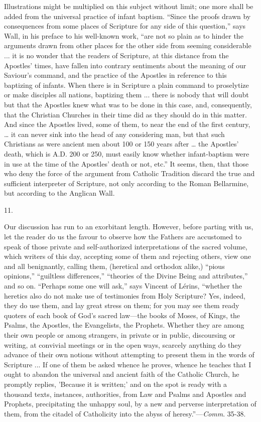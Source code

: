 Illustrations might be multiplied on this subject
without limit; one more shall be added from the universal practice of
infant baptism. ``Since the proofs drawn by consequences from some
places of Scripture for any side of this question,'' says Wall, in his
preface to his well-known work, ``are not so plain as to hinder the
arguments drawn from other places for the other side from seeming
considerable ... it is no wonder that the readers of Scripture, at
this distance from the Apostles' times, have fallen into contrary
sentiments about the meaning of our Saviour's command, and the
practice of the Apostles in reference to this baptizing of infants.
When there is in Scripture a plain command to proselytize or make
disciples all nations, baptizing them ... there is nobody that will
doubt but that the Apostles knew what was to be done in this case,
and, consequently, that the Christian Churches in their time did as
they should do in this matter. And since the Apostles lived, some of
them, to near the end of the first century, … it can never sink into
the head of any considering man, but that such Christians as were
ancient men about 100 or 150 years after … the Apostles' death,
which is A.D. 200 or 250, must
easily know whether infant-baptism were in use at the time of the
Apostles' death or not, etc.'' It seems, then, that those who deny the
force of the argument from Catholic Tradition discard the true and
sufficient interpreter of Scripture, not only according to the Roman
Bellarmine, but according to the Anglican Wall.

11.

Our discussion has run to an exorbitant length.
However, before parting with us, let the reader do us the favour
to observe how the Fathers are accustomed to speak of those private
and self-authorized interpretations of the sacred volume, which
writers of this day, accepting some of them and rejecting others, view
one and all benignantly, calling them, (heretical and orthodox alike,)
``pious opinions,'' ``guiltless differences,'' ``theories of the Divine
Being and attributes,'' and so on. ``Perhaps some one will ask,'' says
Vincent of Lérins, ``whether the heretics also do not make use of
testimonies from Holy Scripture? Yes, indeed, they do use them, and
lay great stress on them; for you may see them ready quoters of each
book of God's sacred law—the books of Moses, of Kings, the Psalms,
the Apostles, the Evangelists, the Prophets. Whether they are among
their own people or among strangers, in private or in public,
discoursing or writing, at convivial meetings or in the open ways,
scarcely anything do they advance of their own notions without
attempting to present them in the words of Scripture ... If one of
them be asked whence he proves, whence he teaches that I ought to
abandon the universal and ancient faith of the Catholic Church, he
promptly replies, 'Because it is written;' and on the spot is ready
with a thousand texts, instances, authorities, from Law and Psalms and
Apostles and Prophets, precipitating the unhappy soul, by a new and
perverse interpretation of them, from the citadel of Catholicity into
the abyss of heresy.''—\emph{Comm}. 35-38.

